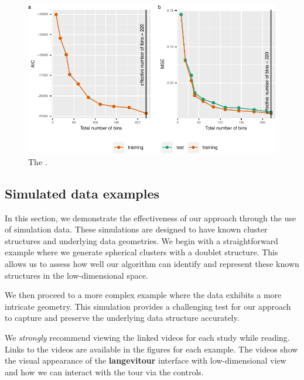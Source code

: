 \documentclass[
  12pt]{article}
\begin{document}
\begin{figure}

{\centering \includegraphics[width=1\textwidth,height=\textheight]{paper_files/figure-pdf/fig-diagnosticplt-1.pdf}

}

\caption{\label{fig-diagnosticplt}The .}

\end{figure}

\hypertarget{sec-simpleex}{%
\subsection{Simulated data examples}\label{sec-simpleex}}

In this section, we demonstrate the effectiveness of our approach
through the use of simulation data. These simulations are designed to
have known cluster structures and underlying data geometries. We begin
with a straightforward example where we generate spherical clusters with
a doublet structure. This allows us to assess how well our algorithm can
identify and represent these known structures in the low-dimensional
space.

We then proceed to a more complex example where the data exhibits a more
intricate geometry. This simulation provides a challenging test for our
approach to capture and preserve the underlying data structure
accurately.

We \emph{strongly} recommend viewing the linked videos for each study
while reading. Links to the videos are available in the figures for each
example. The videos show the visual appearance of the
\textbf{langevitour} interface with low-dimensional view and how we can
interact with the tour via the controls.
\end{document}
